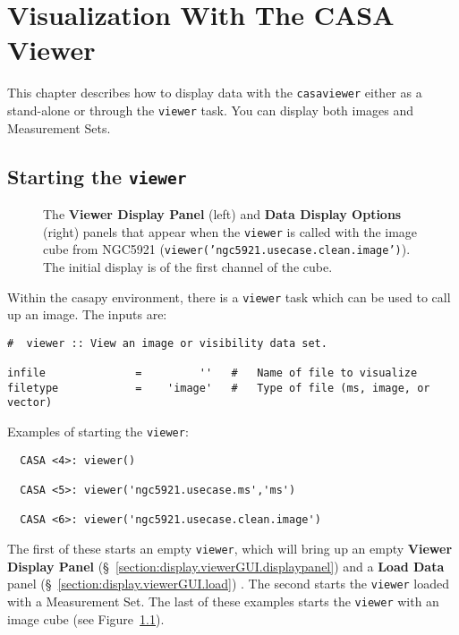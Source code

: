 

\chapter{Visualization With The CASA Viewer}
\label{chapter:display}

This chapter describes how to display data with the {\tt casaviewer}
either as a stand-alone or through the {\tt viewer} task. You can
display both images and Measurement Sets.

\section{Starting the {\tt viewer}}
\label{section:display.start}

\begin{figure}[h!]
\begin{center}
\caption{\label{fig:viewer_start} The {\bf Viewer Display Panel} (left) and 
{\bf Data Display Options} (right) panels that appear when the 
{\tt viewer} is called with the image cube from NGC5921
({\tt viewer('ngc5921.usecase.clean.image')}).  The initial display is
of the first channel of the cube.}
\hrulefill
\end{center}
\end{figure}

Within the casapy environment, there is a {\tt viewer} task
which can be used to call up an image.  The inputs are:
\small
\begin{verbatim}
#  viewer :: View an image or visibility data set.

infile              =         ''   #   Name of file to visualize
filetype            =    'image'   #   Type of file (ms, image, or vector)
\end{verbatim}
\normalsize

Examples of starting the {\tt viewer}:
\small
\begin{verbatim}
  CASA <4>: viewer()

  CASA <5>: viewer('ngc5921.usecase.ms','ms')

  CASA <6>: viewer('ngc5921.usecase.clean.image')
\end{verbatim}
\normalsize
The first of these starts an empty {\tt viewer}, which will bring up
an empty {\bf Viewer Display Panel} 
(\S~\ref{section:display.viewerGUI.displaypanel}) and a {\bf Load Data} panel 
(\S~\ref{section:display.viewerGUI.load}) .  The second starts the
{\tt viewer} loaded with a Measurement Set.  The last of these examples
starts the {\tt viewer} with an image cube 
(see Figure~\ref{fig:viewer_start}).

